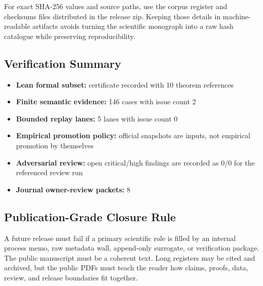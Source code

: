 For exact SHA-256 values and source paths, use the corpus register and checksums files distributed in the release zip. Keeping those details in machine-readable artifacts avoids turning the scientific monograph into a raw hash catalogue while preserving reproducibility.


\subsection{Verification Summary}

\begin{itemize}[leftmargin=1.8em]

\item \textbf{Lean formal subset:} certificate recorded with 10 theorem references

\item \textbf{Finite semantic evidence:} 146 cases with issue count 2

\item \textbf{Bounded replay lanes:} 5 lanes with issue count 0

\item \textbf{Empirical promotion policy:} official snapshots are inputs, not empirical promotion by themselves

\item \textbf{Adversarial review:} open critical/high findings are recorded as 0/0 for the referenced review run

\item \textbf{Journal owner-review packets:} 8

\end{itemize}

\subsection{Publication-Grade Closure Rule}

A future release must fail if a primary scientific role is filled by an internal process memo, raw metadata wall, append-only surrogate, or verification package. The public manuscript must be a coherent text. Long registers may be cited and archived, but the public PDFs must teach the reader how claims, proofs, data, review, and release boundaries fit together.
